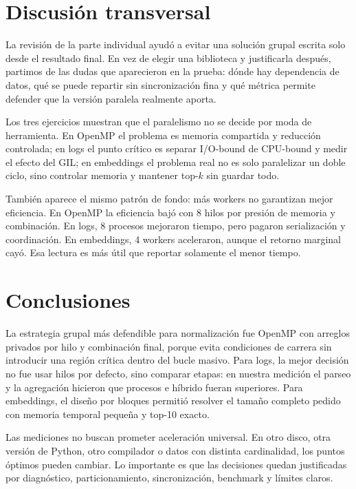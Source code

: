\documentclass[letterpaper,11pt]{article}
\begin{document}
\section{Discusión transversal}

La revisión de la parte individual ayudó a evitar una solución grupal escrita solo desde el resultado final. En vez de elegir una biblioteca y justificarla después, partimos de las dudas que aparecieron en la prueba: dónde hay dependencia de datos, qué se puede repartir sin sincronización fina y qué métrica permite defender que la versión paralela realmente aporta.

Los tres ejercicios muestran que el paralelismo no se decide por moda de herramienta. En OpenMP el problema es memoria compartida y reducción controlada; en logs el punto crítico es separar I/O-bound de CPU-bound y medir el efecto del GIL; en embeddings el problema real no es solo paralelizar un doble ciclo, sino controlar memoria y mantener top-\(k\) sin guardar todo.

También aparece el mismo patrón de fondo: más workers no garantizan mejor eficiencia. En OpenMP la eficiencia bajó con 8 hilos por presión de memoria y combinación. En logs, 8 procesos mejoraron tiempo, pero pagaron serialización y coordinación. En embeddings, 4 workers aceleraron, aunque el retorno marginal cayó. Esa lectura es más útil que reportar solamente el menor tiempo.

\section{Conclusiones}

La estrategia grupal más defendible para normalización fue OpenMP con arreglos privados por hilo y combinación final, porque evita condiciones de carrera sin introducir una región crítica dentro del bucle masivo. Para logs, la mejor decisión no fue usar hilos por defecto, sino comparar etapas: en nuestra medición el parseo y la agregación hicieron que procesos e híbrido fueran superiores. Para embeddings, el diseño por bloques permitió resolver el tamaño completo pedido con memoria temporal pequeña y top-10 exacto.

Las mediciones no buscan prometer aceleración universal. En otro disco, otra versión de Python, otro compilador o datos con distinta cardinalidad, los puntos óptimos pueden cambiar. Lo importante es que las decisiones quedan justificadas por diagnóstico, particionamiento, sincronización, benchmark y límites claros.
\end{document}
